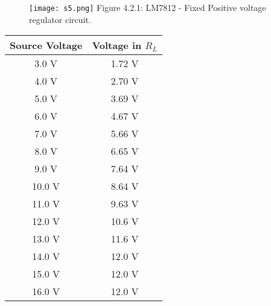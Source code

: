 \begin{multicols}{2}
\begin{tasks}
\begin{figure}[H]
\texttt{[image: s5.png]}
\centering \linebreak \linebreak Figure 4.2.1: LM7812 - Fixed Positive voltage regulator circuit.
\end{figure}
\begin{center}
\begin{tabular}[.5cm]{ c c }
\toprule
Source Voltage & Voltage in $R_{L}$ \\
\midrule
3.0 V & 1.72 V \\
\cmidrule{1-2}
4.0 V & 2.70 V \\
\cmidrule{1-2}
5.0 V & 3.69 V \\
\cmidrule{1-2}
6.0 V & 4.67 V \\
\cmidrule{1-2}
7.0 V & 5.66 V \\
\cmidrule{1-2}
8.0 V & 6.65 V \\
\cmidrule{1-2}
9.0 V & 7.64 V \\
\cmidrule{1-2}
10.0 V & 8.64 V \\
\cmidrule{1-2}
11.0 V & 9.63 V \\
\cmidrule{1-2}
12.0 V & 10.6 V \\
\cmidrule{1-2}
13.0 V & 11.6 V \\
\cmidrule{1-2}
14.0 V & 12.0 V \\
\cmidrule{1-2}
15.0 V & 12.0 V \\
\cmidrule{1-2}
16.0 V & 12.0 V \\
\bottomrule
\end{tabular}
\end{center} 
\end{tasks}
\end{multicols}

\pagebreak